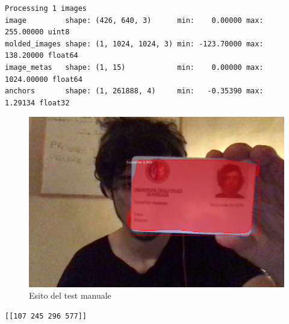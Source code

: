 \documentclass[12pt,a4paper]{article}
\begin{document}
\begin{verbatim}
Processing 1 images
image         shape: (426, 640, 3)      min:    0.00000 max:  255.00000 uint8
molded_images shape: (1, 1024, 1024, 3) min: -123.70000 max:  138.20000 float64
image_metas   shape: (1, 15)            min:    0.00000 max: 1024.00000 float64
anchors       shape: (1, 261888, 4)     min:   -0.35390 max:    1.29134 float32
\end{verbatim}

\begin{figure}[H]
    \caption{Esito del test manuale}
    \centering
    \includegraphics[width=\textwidth,height=\textheight,keepaspectratio]{document_recognition_29_1.png}
\end{figure}

\begin{verbatim}
[[107 245 296 577]]
\end{verbatim}

\pagebreak
\listoffigures
\listoflistings
\end{document}
